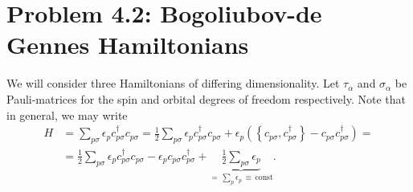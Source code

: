 \documentclass[english, parskip=full]{scrartcl}
\newcommand{\kla}{}
\newcommand{\klammer}{}
\newcommand{\tecxt}{}
\begin{document}
\newpage
\section*{Problem 4.2: Bogoliubov-de Gennes Hamiltonians}
We will consider three Hamiltonians of differing dimensionality.
Let $\tau_\alpha$ and $\sigma_\alpha$ be Pauli-matrices for the spin and orbital degrees of freedom respectively.
Note that in general, we may write
\begin{align}
H &= \sum_{p\sigma} \epsilon_p c_{p\sigma}^\dagger c_{p\sigma} = \frac{1}{2}\sum_{p\sigma} \epsilon_p c_{p\sigma}^\dagger c_{p\sigma} + \epsilon_p \kla\left( \klammer\left\{ c_{p\sigma},c_{p\sigma}^\dagger \right\} - c_{p\sigma}c_{p\sigma}^\dagger \right) = \\
&= \frac{1}{2} \sum_{p\sigma} \epsilon_p c_{p\sigma}^\dagger c_{p\sigma} - \epsilon_p c_{p\sigma}c_{p\sigma}^\dagger + \underbrace{\frac{1}{2}\sum_{p\sigma} \epsilon_p}_{=\,\sum_p\epsilon_p \,\equiv\, \tecxt\text{const}}.
\end{align}
\end{document}
